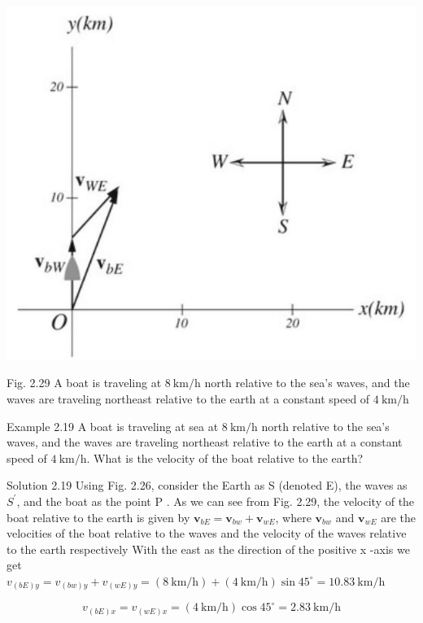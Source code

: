 \documentclass[10pt]{article}
\begin{document}
\begin{center}
\includegraphics[max width=\textwidth]{2024_09_13_db1f357d2aad0a03eb2eg-042}
\end{center}

Fig. 2.29 A boat is traveling at $8 \mathrm{~km} / \mathrm{h}$ north relative to the sea's waves, and the waves are traveling northeast relative to the earth at a constant speed of $4 \mathrm{~km} / \mathrm{h}$

Example 2.19 A boat is traveling at sea at $8 \mathrm{~km} / \mathrm{h}$ north relative to the sea's waves, and the waves are traveling northeast relative to the earth at a constant speed of $4 \mathrm{~km} / \mathrm{h}$. What is the velocity of the boat relative to the earth?

Solution 2.19 Using Fig. 2.26, consider the Earth as S (denoted E), the waves as $S^{\prime}$, and the boat as the point P . As we can see from Fig. 2.29, the velocity of the boat relative to the earth is given by $\mathbf{v}_{b E}=\mathbf{v}_{b w}+\mathbf{v}_{w E}$, where $\mathbf{v}_{b w}$ and $\mathbf{v}_{w E}$ are the velocities of the boat relative to the waves and the velocity of the waves relative to the earth respectively With the east as the direction of the positive x -axis we get\\
$v_{(b E) y}=v_{(b w) y}+v_{(w E) y}=(8 \mathrm{~km} / \mathrm{h})+(4 \mathrm{~km} / \mathrm{h}) \sin 45^{\circ}=10.83 \mathrm{~km} / \mathrm{h}$

$$
v_{(b E) x}=v_{(w E) x}=(4 \mathrm{~km} / \mathrm{h}) \cos 45^{\circ}=2.83 \mathrm{~km} / \mathrm{h}
$$
\end{document}
